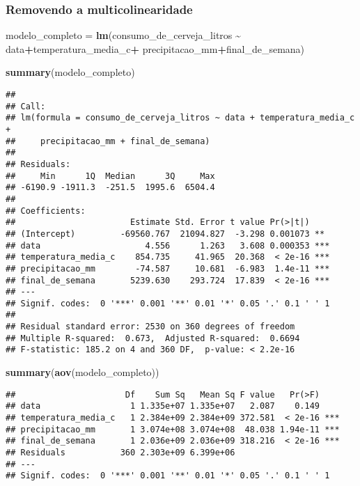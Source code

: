 \documentclass[
]{article}
\newenvironment{Shaded}{\begin{snugshade}}{\end{snugshade}}
\newcommand{\FunctionTok}[1]{\textcolor[rgb]{0.13,0.29,0.53}{\textbf{#1}}}
\newcommand{\NormalTok}[1]{#1}
\newcommand{\OtherTok}[1]{\textcolor[rgb]{0.56,0.35,0.01}{#1}}
\newcommand{\SpecialCharTok}[1]{\textcolor[rgb]{0.81,0.36,0.00}{\textbf{#1}}}
\begin{document}
\hypertarget{removendo-a-multicolinearidade}{%
\subsubsection{Removendo a
multicolinearidade}\label{removendo-a-multicolinearidade}}

\begin{Shaded}
\begin{Highlighting}[]
\NormalTok{modelo\_completo }\OtherTok{=} \FunctionTok{lm}\NormalTok{(consumo\_de\_cerveja\_litros }\SpecialCharTok{\textasciitilde{}}\NormalTok{ data}\SpecialCharTok{+}\NormalTok{temperatura\_media\_c}\SpecialCharTok{+}
\NormalTok{                       precipitacao\_mm}\SpecialCharTok{+}\NormalTok{final\_de\_semana)}

\FunctionTok{summary}\NormalTok{(modelo\_completo)}
\end{Highlighting}
\end{Shaded}

\begin{verbatim}
## 
## Call:
## lm(formula = consumo_de_cerveja_litros ~ data + temperatura_media_c + 
##     precipitacao_mm + final_de_semana)
## 
## Residuals:
##     Min      1Q  Median      3Q     Max 
## -6190.9 -1911.3  -251.5  1995.6  6504.4 
## 
## Coefficients:
##                       Estimate Std. Error t value Pr(>|t|)    
## (Intercept)         -69560.767  21094.827  -3.298 0.001073 ** 
## data                     4.556      1.263   3.608 0.000353 ***
## temperatura_media_c    854.735     41.965  20.368  < 2e-16 ***
## precipitacao_mm        -74.587     10.681  -6.983  1.4e-11 ***
## final_de_semana       5239.630    293.724  17.839  < 2e-16 ***
## ---
## Signif. codes:  0 '***' 0.001 '**' 0.01 '*' 0.05 '.' 0.1 ' ' 1
## 
## Residual standard error: 2530 on 360 degrees of freedom
## Multiple R-squared:  0.673,  Adjusted R-squared:  0.6694 
## F-statistic: 185.2 on 4 and 360 DF,  p-value: < 2.2e-16
\end{verbatim}

\begin{Shaded}
\begin{Highlighting}[]
\FunctionTok{summary}\NormalTok{(}\FunctionTok{aov}\NormalTok{(modelo\_completo))}
\end{Highlighting}
\end{Shaded}

\begin{verbatim}
##                      Df    Sum Sq   Mean Sq F value   Pr(>F)    
## data                  1 1.335e+07 1.335e+07   2.087    0.149    
## temperatura_media_c   1 2.384e+09 2.384e+09 372.581  < 2e-16 ***
## precipitacao_mm       1 3.074e+08 3.074e+08  48.038 1.94e-11 ***
## final_de_semana       1 2.036e+09 2.036e+09 318.216  < 2e-16 ***
## Residuals           360 2.303e+09 6.399e+06                     
## ---
## Signif. codes:  0 '***' 0.001 '**' 0.01 '*' 0.05 '.' 0.1 ' ' 1
\end{verbatim}
\end{document}
